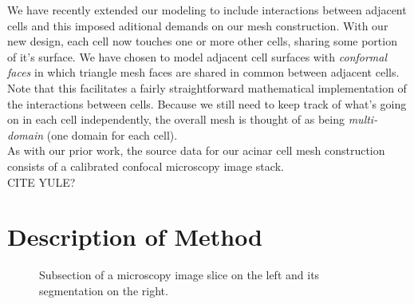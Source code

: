 \documentclass[a4paper,10pt]{article}
\begin{document}
We have recently extended our modeling to include interactions between adjacent cells and this imposed aditional demands on our mesh construction. With our new design, each cell now touches one or more other cells, sharing some portion of it's surface. We have chosen to model adjacent cell surfaces with \emph{conformal faces} in which triangle mesh faces are shared in common between adjacent cells. Note that this facilitates a fairly straightforward mathematical implementation of the interactions between cells. Because we still need to keep track of what's going on in each cell independently, the overall mesh is thought of as being \emph{multi-domain} (one domain for each cell). \\

As with our prior work, the source data for our acinar cell mesh construction consists of a calibrated confocal microscopy image stack.\\ 
CITE YULE?\\

\section{Description of Method}

\begin{figure}[H]
\begin{center}
\hspace{0.5cm}
\end{center}
\caption{Subsection of a microscopy image slice on the left and its segmentation on the right.}
\label{fig:slice}
\end{figure}
\end{document}
